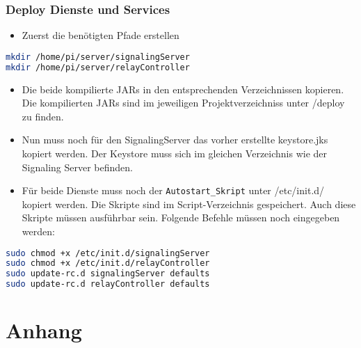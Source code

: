 \subsubsection{Deploy Dienste und Services}
\begin{itemize}
	\item Zuerst die benötigten Pfade erstellen
\end{itemize}

\begin{lstlisting}[backgroundcolor = \color{snippetcolor},
language = bash,
xleftmargin = 0.5cm,
framexleftmargin = 0.1em,
breaklines=true]
mkdir /home/pi/server/signalingServer
mkdir /home/pi/server/relayController
\end{lstlisting}

\begin{itemize}
	\item Die beide kompilierte JARs in den entsprechenden Verzeichnissen kopieren. Die kompilierten JARs sind im jeweiligen Projektverzeichniss unter /deploy zu finden.
	\item Nun muss noch für den SignalingServer das vorher erstellte keystore.jks kopiert werden. Der Keystore muss sich im gleichen Verzeichnis wie der Signaling Server befinden.
	\item Für beide Dienste muss noch der \texttt{Autostart\_Skript} unter /etc/init.d/ kopiert werden. Die Skripte sind im Script-Verzeichnis gespeichert. Auch diese Skripte müssen ausführbar sein. Folgende Befehle müssen noch eingegeben werden:
\end{itemize}

\begin{lstlisting}[backgroundcolor = \color{snippetcolor},
language = bash,
xleftmargin = 0.5cm,
framexleftmargin = 0.1em,
breaklines=true]
sudo chmod +x /etc/init.d/signalingServer
sudo chmod +x /etc/init.d/relayController
sudo update-rc.d signalingServer defaults
sudo update-rc.d relayController defaults 
\end{lstlisting}

\section{Anhang}
\label{sec:anhang}

